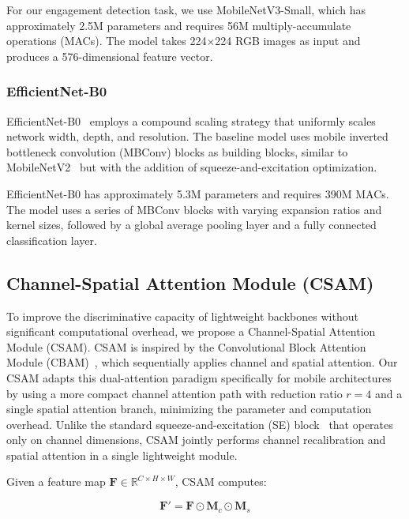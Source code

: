 \documentclass[apajournal,article,submit,pdftex,moreauthors]{Definitions/mdpi}
\begin{document}
For our engagement detection task, we use MobileNetV3-Small, which has approximately 2.5M parameters and requires 56M multiply-accumulate operations (MACs). The model takes 224$\times$224 RGB images as input and produces a 576-dimensional feature vector.

\subsubsection{EfficientNet-B0}

EfficientNet-B0~\citep{tan2019efficientnet} employs a compound scaling strategy that uniformly scales network width, depth, and resolution. The baseline model uses mobile inverted bottleneck convolution (MBConv) blocks as building blocks, similar to MobileNetV2~\citep{sandler2018mobilenetv2} but with the addition of squeeze-and-excitation optimization.

EfficientNet-B0 has approximately 5.3M parameters and requires 390M MACs. The model uses a series of MBConv blocks with varying expansion ratios and kernel sizes, followed by a global average pooling layer and a fully connected classification layer.

\subsection{Channel-Spatial Attention Module (CSAM)}

To improve the discriminative capacity of lightweight backbones without significant computational overhead, we propose a Channel-Spatial Attention Module (CSAM). CSAM is inspired by the Convolutional Block Attention Module (CBAM)~\citep{woo2018cbam}, which sequentially applies channel and spatial attention. Our CSAM adapts this dual-attention paradigm specifically for mobile architectures by using a more compact channel attention path with reduction ratio $r=4$ and a single spatial attention branch, minimizing the parameter and computation overhead. Unlike the standard squeeze-and-excitation (SE) block~\citep{howard2019mobilenetv3} that operates only on channel dimensions, CSAM jointly performs channel recalibration and spatial attention in a single lightweight module.

Given a feature map $\mathbf{F} \in \mathbb{R}^{C \times H \times W}$, CSAM computes:

\begin{equation}
\mathbf{F}' = \mathbf{F} \odot \mathbf{M}_c \odot \mathbf{M}_s
\end{equation}
\end{document}
